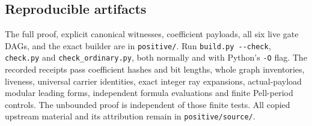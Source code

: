 \subsection{Reproducible artifacts}
The full proof, explicit canonical witnesses, coefficient payloads, all six live gate DAGs, and the exact builder are in \texttt{positive/}. Run \texttt{build.py -{}-check}, \texttt{check.py} and \texttt{check\_ordinary.py}, both normally and with Python's \texttt{-O} flag. The recorded receipts pass coefficient hashes and bit lengths, whole graph inventories, liveness, universal carrier identities, exact integer ray expansions, actual-payload modular leading forms, independent formula evaluations and finite Pell-period controls. The unbounded proof is independent of those finite tests. All copied upstream material and its attribution remain in \texttt{positive/source/}.
